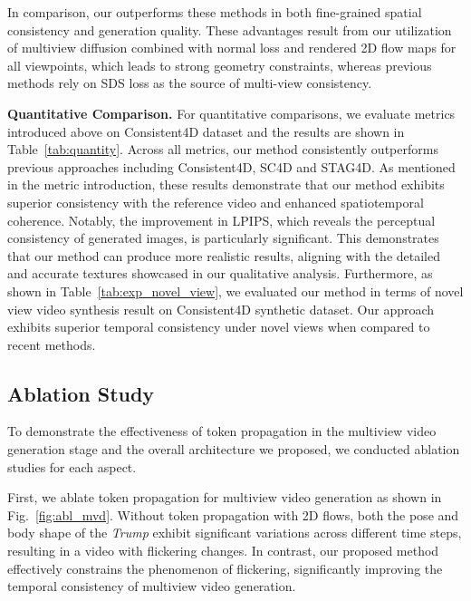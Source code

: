 In comparison, our \methodname outperforms these methods in both fine-grained spatial consistency and generation quality. These advantages result from our utilization of multiview diffusion combined with normal loss and rendered 2D flow maps for all viewpoints, which leads to strong geometry constraints, whereas previous methods rely on SDS loss as the source of multi-view consistency.


\textbf{Quantitative Comparison.} For quantitative comparisons, we evaluate metrics introduced above on Consistent4D dataset and the results are shown in Table~\ref{tab:quantity}. Across all metrics, our method consistently outperforms previous approaches including Consistent4D, SC4D and STAG4D. As mentioned in the metric introduction, these results demonstrate that our method exhibits superior consistency with the reference video and enhanced spatiotemporal coherence. Notably, the improvement in LPIPS, which reveals the perceptual consistency of generated images, is particularly significant. This demonstrates that our method can produce more realistic results, aligning with the detailed and accurate textures showcased in our qualitative analysis.
Furthermore, as shown in Table~\ref{tab:exp_novel_view}, we evaluated our method in terms of novel view video synthesis result on Consistent4D synthetic dataset. Our approach exhibits superior temporal consistency under novel views when compared to recent methods.


\subsection{Ablation Study}


To demonstrate the effectiveness of token propagation in the multiview video generation stage and the overall architecture we proposed, we conducted ablation studies for each aspect.


First, we ablate token propagation for multiview video generation as shown in Fig.~\ref{fig:abl_mvd}. Without token propagation with 2D flows, both the pose and body shape of the \textit{Trump} exhibit significant variations across different time steps, resulting in a video with flickering changes. In contrast, our proposed method effectively constrains the phenomenon of flickering, significantly improving the temporal consistency of multiview video generation.


